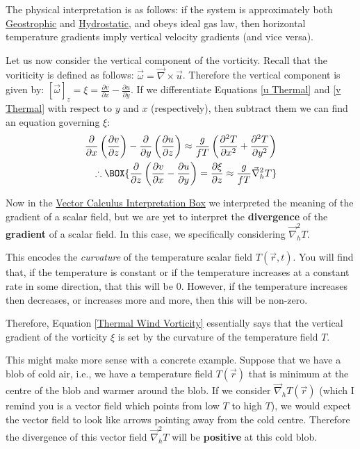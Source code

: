 The physical interpretation is as follows: if the system is approximately both \hyperref[Geostrophic Box]{Geostrophic} and \hyperref[Hydrostatic GFD Box]{Hydrostatic}, and obeys ideal gas law, then horizontal temperature gradients imply vertical velocity gradients (and vice versa).

Let us now consider the vertical component of the vorticity. Recall that the voriticity is defined as follows: $\vec{\omega}=\vec{\nabla}\times\vec{u}$. Therefore the vertical component is given by: $[\vec{\omega}]_z=\xi=\frac{\partial v}{\partial x}-\frac{\partial u}{\partial y}$. If we differentiate Equations \ref{u Thermal} and \ref{v Thermal} with respect to $y$ and $x$ (respectively), then subtract them we can find an equation governing $\xi$:
\begin{align}
    \frac{\partial}{\partial x}\left( \frac{\partial v}{\partial z} \right) - \frac{\partial}{\partial y}\left( \frac{\partial u}{\partial z} \right)
    \approx
    \frac{g}{fT}\left( 
        \frac{\partial^2 T}{\partial x^2}+\frac{\partial^2 T}{\partial y^2}
     \right)\nonumber
     \\
    \label{Thermal Wind Vorticity}
    \therefore
    \BOX{
        \frac{\partial}{\partial z}\left( \frac{\partial v}{\partial x}- \frac{\partial u}{\partial y} \right)=
        \frac{\partial \xi}{\partial z}
        \approx
        \frac{g}{fT}\vec{\nabla}_h^2 T
    }
\end{align}

Now in the \hyperref[VC Interp]{Vector Calculus Interpretation Box} we interpreted the meaning of the gradient of a scalar field, but we are yet to interpret the \textbf{divergence} of the \textbf{gradient} of a scalar field. In this case, we specifically considering $\vec{\nabla}_h^2 T$.

This encodes the \textit{curvature} of the temperature scalar field $T(\vec{r},t)$. You will find that, if the temperature is constant or if the temperature increases at a constant rate in some direction, that this will be $0$. However, if the temperature increases then decreases, or increases more and more, then this will be non-zero.

Therefore, Equation \ref{Thermal Wind Vorticity} essentially says that the vertical gradient of the vorticity $\xi$ is set by the curvature of the temperature field $T$. 

This might make more sense with a concrete example. Suppose that we have a blob of cold air, i.e., we have a temperature field $T(\vec{r})$ that is minimum at the centre of the blob and warmer around the blob. If we consider $\vec{\nabla}_h T(\vec{r})$ (which I remind you is a vector field which points from low $T$ to high $T$), we would expect the vector field to look like arrows pointing away from the cold centre. Therefore the divergence of this vector field $\vec{\nabla}_h^2 T$ will be \textbf{positive} at this cold blob.


